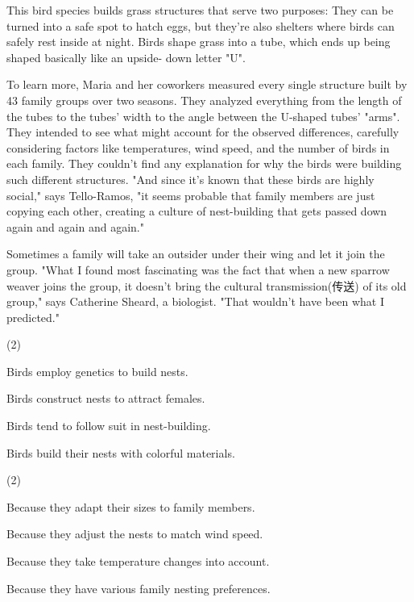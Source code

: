 \documentclass{英语试卷}
\begin{document}
\par This bird species builds grass structures that serve two purposes: They can be turned into a safe spot to hatch eggs, but they're also shelters where birds can safely rest inside at night. Birds shape grass into a tube, which ends up being shaped basically like an upside- down letter "U".\par
\par To learn more, Maria and her coworkers measured every single structure built by 43 family groups over two seasons. They analyzed everything from the length of the tubes to the tubes' width to the angle between the U-shaped tubes' "arms". They intended to see what might account for the observed differences, carefully considering factors like temperatures, wind speed, and the number of birds in each family. They couldn't find any explanation for why the birds were building such different structures. "And since it's known that these birds are highly social," says Tello-Ramos, "it seems probable that family members are just copying each other, creating a culture of nest-building that gets passed down again and again and again."\par
\par Sometimes a family will take an outsider under their wing and let it join the group. "What I found most fascinating was the fact that when a new sparrow weaver joins the group, it doesn't bring the cultural transmission(传送) of its old group," says Catherine Sheard, a biologist. "That wouldn't have been what I predicted."\par
{}
\begin{choices}(2)
  \item Birds employ genetics to build nests.
  \item Birds construct nests to attract females.
  \item Birds tend to follow suit in nest-building.
  \item Birds build their nests with colorful materials.
\end{choices}
\begin{choices}(2)
  \item Because they adapt their sizes to family members.
  \item Because they adjust the nests to match wind speed.
  \item Because they take temperature changes into account.
  \item Because they have various family nesting preferences.
\end{choices}
\end{document}
